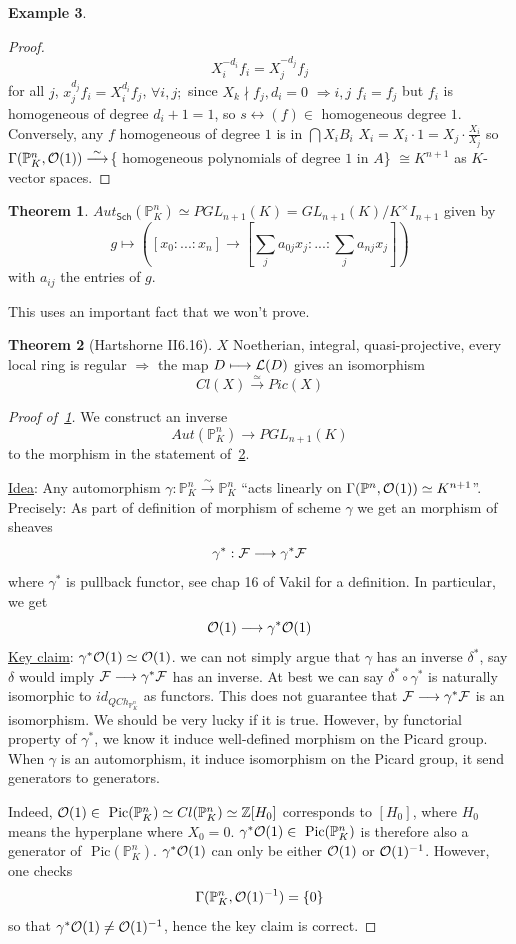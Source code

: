 \documentclass[11pt]{article}
\theoremstyle{definition}
\newtheorem{thm}{Theorem}[section]
\newtheorem{ex}[thm]{Example}
\newcommand{\pic}{\text{ Pic}}
\newcommand{\proj}{\mathbb P}
\newcommand{\intg}{\mathbb Z}
\newcommand{\calf}{{\cal F}}
\newcommand{\call}{{\cal L}}
\newcommand{\calo}{{\cal O}}
\newcommand{\Lrta}{\Longrightarrow}
\newcommand{\lrta}{\longrightarrow}
\newcommand{\llrta}{\longleftrightarrow}
\begin{document}
\begin{ex}
\begin{enumerate}[label=\boxed{\arabic*}]
\begin{proof}
 $$
 X_i^{-d_i}f_i=X_j^{-d_j}f_j
 $$
 for all $j$,
 $x_j^{d_j} f_i=X_i^{d_i}f_j$, $\forall i,j;$ since $X_k\nmid f_j, d_i=0$ $\Lrta i,j$ $f_i=f_j$ but $f_i$ is homogeneous of degree $d_{i}+1=1$, so $s\llrta (f)\in$ homogeneous degree $1$. Conversely, any $f$ homogeneous of degree $1$ is in $\bigcap X_i B_i$ $X_i=X_i\cdot 1=X_j\cdot \frac{X_i}{X_j}$ so $\Gamma(\proj^n_K,\calo(1))\overset{\sim}{\lrta}$\{ homogeneous polynomials of degree $1$ in $A$\} $\cong K^{n+1}$ as $K$-vector spaces. 
 \end{proof}
\begin{thm}\label{thm:aut_Proj}
$Aut_{\mathsf{Sch}}(\proj^n_K)\simeq PGL_{n+1}(K)=GL_{n+1}(K)/K^\times I_{n+1}$ given by
$$
g\longmapsto ([x_0:...:x_n]\lrta[\sum_j a_{0j}x_j:...:\sum_j a_{nj} x_j]) 
$$
with $a_{ij}$ the entries of $g$.  
\end{thm}
This uses an important fact that we won't prove.
\begin{thm}[Hartshorne II6.16]
\label{thm:Hart_II_6.16}$X$ Noetherian, integral, quasi-projective, every local ring is regular
$\Lrta$ the map $D\longmapsto \call(D)$ gives an isomorphism 
$$
Cl(X)\overset{\simeq}{\lrta}Pic(X)
$$
\begin{proof}[Proof of~\ref{thm:aut_Proj}]
We construct an inverse
$$
Aut(\proj^n_K)\lrta PGL_{n+1}(K)
$$
to the morphism in the statement of~\ref{thm:Hart_II_6.16}. 

\underline{Idea}: Any automorphism $\gamma:\proj^n_K\overset{\sim}{\lrta}\proj^n_K$ ``acts linearly on $\Gamma(\proj^n,\calo(1))\simeq K^{n+1}$''. Precisely: As part of definition of morphism of scheme $\gamma$ we get an morphism of sheaves
$$
\gamma^*:\calf\lrta \gamma^*\calf
$$
where $\gamma^*$ is pullback functor, see chap 16 of Vakil for a definition.
In particular, we get 
$$
\calo(1)\lrta\gamma^*\calo(1)
$$
\underline{Key claim}: $\gamma^*\calo(1)\simeq \calo(1)$. {\color{red} we can not simply argue that $\gamma$ has an inverse $\delta^*$, say $\delta$ would imply $\calf\lrta\gamma^*\calf$ has an inverse. At best we can say $\delta^*\circ\gamma^*$ is naturally isomorphic to $id_{QCh_{\proj^n_K}}$ as functors. This does not guarantee that $\calf\lrta\gamma^*\calf$ is an isomorphism. We should be very lucky if it is true.} 
However, by functorial property of $\gamma^*$, we know it induce well-defined morphism on the Picard group. When $\gamma$ is an automorphism, it induce isomorphism on the Picard group, it send generators to generators.

Indeed, $\calo(1)\in \pic(\proj^n_K)\simeq Cl(\proj^n_K)\simeq \intg[H_0]$ corresponds to $[H_0]$, where $H_0$ means the hyperplane where $X_0=0$.
$\gamma^*\calo(1)\in \pic(\proj^n_K)$ is therefore also a generator of $\pic(\proj^n_K)$. $\gamma^*\calo(1)$ can only be either $\calo(1)$ or $\calo(1)^{-1}$. However, one checks 
$$
\Gamma(\proj^n_K,\calo(1)^{-1})=\{0\}
$$
so that  $\gamma^*\calo(1)\neq \calo(1)^{-1}$, hence the key claim is correct.


\end{proof}
\end{thm}
\end{enumerate}
\end{ex}
\end{document}
